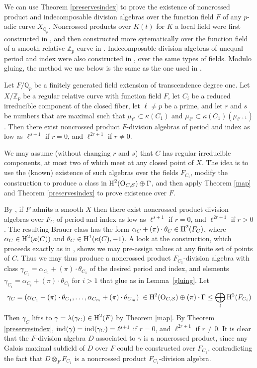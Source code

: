 \documentclass{amsart}
\theoremstyle{plain}
\theoremstyle{definition}
\theoremstyle{remark}
\numberwithin{equation}{section}%
\renewcommand{\H}{{\text{\rm H}}}
\renewcommand{\O}{{\text{\rm O}}}
\newcommand{\Q}{{\mathbb Q}}
\renewcommand{\S}{{\mathcal S}}
\newcommand{\Z}{{\mathbb Z}}
\newcommand{\ind}{{\text{\rm ind}}}
\newcommand{\Pf}{{\noindent{\it Proof.}\;\;}}
\begin{document}
We can use Theorem \ref{preservesindex} to prove the existence of 
noncrossed product and indecomposable division algebras over the function
field $F$ of any $p$-adic curve $X_{\Q_p}$.
Noncrossed products over $K(t)$ for $K$ a local field were first
constructed in \cite{Br01a}, and then constructed more sytematically over
the function field of a smooth relative $\Z_p$-curve in \cite{BMT}.
Indecomposable division algebras of unequal period and index were also constructed in 
\cite{BMT}, over the same types of fields.
Modulo gluing,
the method we use below is the same as the one
used in \cite[Theorem 4.3, Corollary 4.8]{BMT}.

\Theorem\label{noncrossed}
Let $F/\Q_p$ be a finitely generated field extension of transcendence degree one.
Let $X/\Z_p$ be a regular relative curve with function field
$F$, let $C_i$ be a reduced irreducible
component of the closed fiber, let $\ell\neq p$ be a prime, 
and let $r$ and $s$ be numbers that are maximal such that $\mu_{\ell^r}\subset \kappa(C_1)$
and $\mu_{\ell^s}\subset \kappa(C_1)(\mu_{\ell^{r+1}})$.
Then there exist noncrossed product $F$-division algebras of period and index
as low as
$\ell^{s+1}$ if $r=0$, and $\ell^{2r+1}$ if $r\neq 0$.
\rm

\Pf
We may assume (without changing $r$ and $s$) that $C$ has regular irreducible components,
at most two of which meet at any closed point of $X$.
The idea is to use the (known) existence of such algebras over the fields
$F_{C_i}$, modify the construction to
produce a class in $\H^2(\O_{C,\S})\oplus\Gamma$, and then apply
Theorem \ref{map} and Theorem \ref{preservesindex} to prove existence over $F$.

By \cite[Theorem 4.7]{BMT}, if $F$ admits a smooth $X$
then there exist noncrossed product division algebras
over $F_C$ of period and index as low as
$\ell^{s+1}$ if $r=0$, and $\ell^{2r+1}$ if $r>0$.
The resulting Brauer class has the form 
$\alpha_{C}+(\pi)\cdot\theta_{C}\in\H^2(F_{C})$,
where $\alpha_{C}\in\H^2(\kappa(C))$ and $\theta_{C}\in\H^1(\kappa(C),-1)$.
A look at the construction, which proceeds exactly as in \cite[Theorem 1]{Br95},
shows we may pre-assign values at any finite set of points of $C$. 
Thus we may thus produce a noncrossed product $F_{C_1}$-division
algebra with class $\gamma_{C_1}=\alpha_{C_1}+(\pi)\cdot\theta_{C_1}$ 
of the desired period and index, and elements $\gamma_{C_i}=\alpha_{C_i}+(\pi)\cdot\theta_{C_i}$ for $i>1$ 
that glue as in Lemma~\ref{gluing}.  Let
$$
\gamma_C=
(\alpha_{C_1}+(\pi)\cdot\theta_{C_1},\dots,
\alpha_{C_m}+(\pi)\cdot\theta_{C_m})\;\in\H^2(\O_{C,\S})\oplus(\pi)\cdot\Gamma\leq\bigoplus_i\H^2(F_{C_i})
$$
Then $\gamma_C$ lifts to $\gamma=\lambda(\gamma_C)\in\H^2(F)$ by Theorem \ref{map}. 
By Theorem \ref{preservesindex}, $\ind(\gamma)=\ind(\gamma_C)=\ell^{s+1}$ if $r=0$, and $\ell^{2r+1}$ if $r\neq 0$.
It is clear that the $F$-division algebra $D$ associated to $\gamma$ is a noncrossed
product, since any Galois maximal subfield of $D$ over $F$ could be constructed over $F_{C_1}$,
contradicting the fact that $D\otimes_F F_{C_1}$ is a noncrossed product $F_{C_1}$-division algebra.
\end{document}
